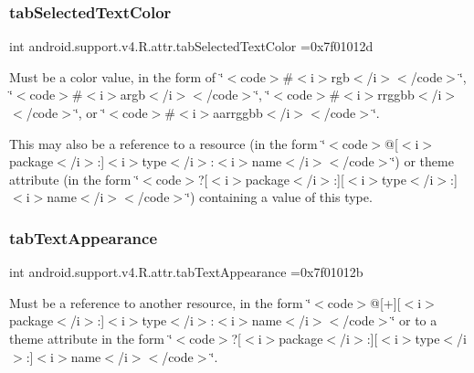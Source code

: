 \subsubsection{\texorpdfstring{tab\+Selected\+Text\+Color}{tabSelectedTextColor}}
{\footnotesize\ttfamily int android.\+support.\+v4.\+R.\+attr.\+tab\+Selected\+Text\+Color =0x7f01012d\hspace{0.3cm}{\ttfamily [static]}}

Must be a color value, in the form of \char`\"{}$<$code$>$\#$<$i$>$rgb$<$/i$>$$<$/code$>$\char`\"{}, \char`\"{}$<$code$>$\#$<$i$>$argb$<$/i$>$$<$/code$>$\char`\"{}, \char`\"{}$<$code$>$\#$<$i$>$rrggbb$<$/i$>$$<$/code$>$\char`\"{}, or \char`\"{}$<$code$>$\#$<$i$>$aarrggbb$<$/i$>$$<$/code$>$\char`\"{}. 

This may also be a reference to a resource (in the form \char`\"{}$<$code$>$@\mbox{[}$<$i$>$package$<$/i$>$\+:\mbox{]}$<$i$>$type$<$/i$>$\+:$<$i$>$name$<$/i$>$$<$/code$>$\char`\"{}) or theme attribute (in the form \char`\"{}$<$code$>$?\mbox{[}$<$i$>$package$<$/i$>$\+:\mbox{]}\mbox{[}$<$i$>$type$<$/i$>$\+:\mbox{]}$<$i$>$name$<$/i$>$$<$/code$>$\char`\"{}) containing a value of this type. \mbox{\label{classandroid_1_1support_1_1v4_1_1R_1_1attr_a24a6389980f226da2272d93c69206a1a}} 
\subsubsection{\texorpdfstring{tab\+Text\+Appearance}{tabTextAppearance}}
{\footnotesize\ttfamily int android.\+support.\+v4.\+R.\+attr.\+tab\+Text\+Appearance =0x7f01012b\hspace{0.3cm}{\ttfamily [static]}}

Must be a reference to another resource, in the form \char`\"{}$<$code$>$@\mbox{[}+\mbox{]}\mbox{[}$<$i$>$package$<$/i$>$\+:\mbox{]}$<$i$>$type$<$/i$>$\+:$<$i$>$name$<$/i$>$$<$/code$>$\char`\"{} or to a theme attribute in the form \char`\"{}$<$code$>$?\mbox{[}$<$i$>$package$<$/i$>$\+:\mbox{]}\mbox{[}$<$i$>$type$<$/i$>$\+:\mbox{]}$<$i$>$name$<$/i$>$$<$/code$>$\char`\"{}. \mbox{\label{classandroid_1_1support_1_1v4_1_1R_1_1attr_af9f7d1989e331de9a1ba5e3e353335ad}} 
